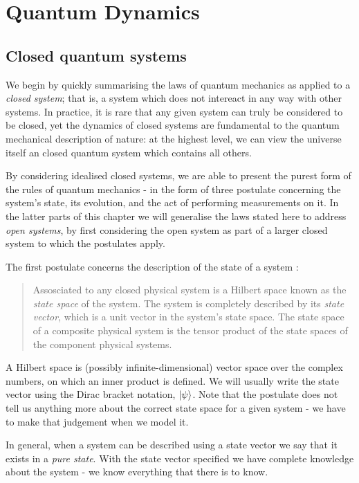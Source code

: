 \chapter{Quantum Dynamics} 
\label{ch:QuantumDynamics}

\section{Closed quantum systems}

We begin by quickly summarising the laws of quantum mechanics as applied to a \textit{closed system}; that is, a system which does not intereact in any way with other systems. In practice, it is rare that any given system can truly be considered to be closed, yet the dynamics of closed systems are fundamental to the quantum mechanical description of nature: at the highest level, we can view the universe itself an closed quantum system which contains all others.

By considering idealised closed systems, we are able to present the purest form of the rules of quantum mechanics - in the form of three postulate concerning the system's state, its evolution, and the act of performing measurements on it. In the latter parts of this chapter we will generalise the laws stated here to address \textit{open systems}, by first considering the open system as part of a larger closed system to which the postulates apply.

The first postulate concerns the description of the state of a system \cite{nielsen+chuang}:
\begin{quotation}
  Assosciated to any closed physical system is a Hilbert space known as the \textit{state space} of the system. The system is completely described by its \textit{state vector}, which is a unit vector in the system's state space. The state space of a composite physical system is the tensor product of the state spaces of the component physical systems.
\end{quotation}
A Hilbert space is (possibly infinite-dimensional) vector space over the complex numbers, on which an inner product is defined. We will usually write the state vector using the Dirac bracket notation, $\left\vert\psi\right\rangle$. Note that the postulate does not tell us anything more about the correct state space for a given system - we have to make that judgement when we model it.

In general, when a system can be described using a state vector we say that it exists in a \textit{pure state}. With the state vector specified we have complete knowledge about the system - we know everything that there is to know.

